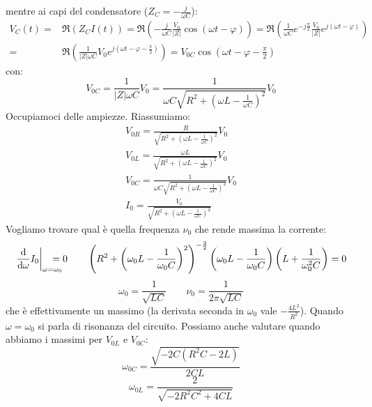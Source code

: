 mentre ai capi del condensatore ($Z_C=-\frac{j}{\omega C}$):
\begin{equation}
  \begin{split}
    V_{C}(t)=&\Re(Z_CI(t))=\Re\left(-\frac{j}{\omega C}\frac{V_0}{|Z|}\cos(\omega t-\varphi)\right)=\Re\left(\frac{1}{\omega C}e^{-j\frac{\pi}{2}}\frac{V_0}{|Z|}e^{j(\omega t-\varphi)}\right)\\
    =&\Re\left(\frac{1}{|Z|\omega C}V_0e^{j\left(\omega t-\varphi-\frac{\pi}{2}\right)}\right)=V_{0C}\cos\left(\omega t-\varphi-\frac{\pi}{2}\right)
  \end{split}
\end{equation}
con:
\begin{equation}
  V_{0C}=\frac{1}{|Z|\omega C}V_0=\frac{1}{\omega C\sqrt{R^2+\left(\omega L-\frac{1}{\omega C}\right)^2}}V_0
\end{equation}
Occupiamoci delle ampiezze. Riassumiamo:
\begin{subequations}
  \begin{gather}
    V_{0R}=\frac{R}{\sqrt{R^2+\left(\omega L-\frac{1}{\omega C}\right)^2}}V_0\\
    V_{0L}=\frac{\omega L}{\sqrt{R^2+\left(\omega L-\frac{1}{\omega C}\right)^2}}V_0\\
    V_{0C}=\frac{1}{\omega C\sqrt{R^2+\left(\omega L-\frac{1}{\omega C}\right)^2}}V_0\\
    I_0=\frac{V_0}{\sqrt{R^2+\left(\omega L-\frac{1}{\omega C}\right)^2}}
  \end{gather}
\end{subequations}
Vogliamo trovare qual è quella frequenza $\nu_0$ che rende massima la corrente:
\[
  \left.\frac{\ud}{\ud \omega}I_0\right|_{\omega=\omega_0}\!\!\!\!\!\!\!\!=0\qquad
  \left(R^2+\left(\omega_0 L-\frac{1}{\omega_0 C}\right)^2\right)^{-\frac{3}{2}}\left(\omega_0 L-\frac{1}{\omega_0 C}\right)\left(L+\frac{1}{\omega_0 ^2 C}\right)=0
\]
\begin{equation}
  \omega_0=\frac{1}{\sqrt{LC}}\qquad \nu_0=\frac{1}{2\pi\sqrt{LC}}
\end{equation}
che è effettivamente un massimo (la derivata seconda in $\omega_0$ vale $-\frac{4L^2}{R^2}$). Quando $\omega=\omega_0$ si parla di risonanza del circuito.
Possiamo anche valutare quando abbiamo i massimi per $V_{0L}$ e $V_{0C}$:
\begin{equation}
  \omega_{0C}=\frac{\sqrt{-2C(R^2C-2L)}}{2CL}
\end{equation}
\begin{equation}
  \omega_{0L}=\frac{2}{\sqrt{-2R^2C^2+4CL}}
\end{equation}
